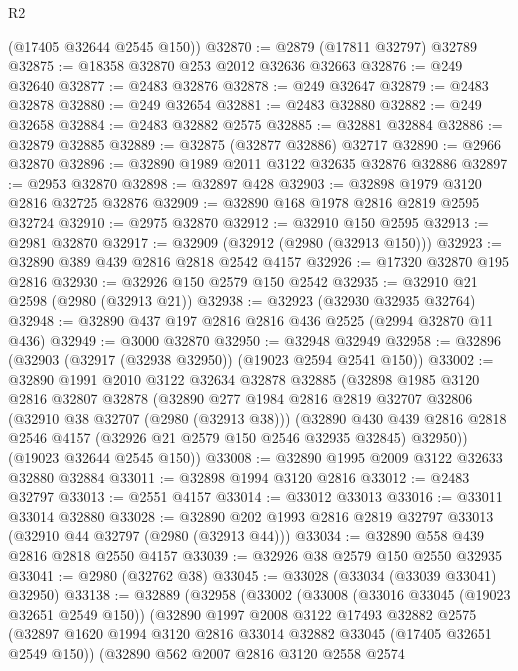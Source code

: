 \begin{lexlean}{R2}
\begin{coremodule}
      (@17405 @32644 @2545 @150))
@32870 := @2879 (@17811 @32797) @32789
@32875 := @18358 @32870 @253 @2012 @32636 @32663
@32876 := @249 @32640
@32877 := @2483 @32876
@32878 := @249 @32647
@32879 := @2483 @32878
@32880 := @249 @32654
@32881 := @2483 @32880
@32882 := @249 @32658
@32884 := @2483 @32882 @2575
@32885 := @32881 @32884
@32886 := @32879 @32885
@32889 := @32875 (@32877 @32886) @32717
@32890 := @2966 @32870
@32896 := @32890 @1989 @2011 @3122 @32635 @32876 @32886
@32897 := @2953 @32870
@32898 := @32897 @428
@32903 := @32898 @1979 @3120 @2816 @32725 @32876
@32909 := @32890 @168 @1978 @2816 @2819 @2595 @32724
@32910 := @2975 @32870
@32912 := @32910 @150 @2595
@32913 := @2981 @32870
@32917 := @32909 (@32912 (@2980 (@32913 @150)))
@32923 := @32890 @389 @439 @2816 @2818 @2542 @4157
@32926 := @17320 @32870 @195 @2816
@32930 := @32926 @150 @2579 @150 @2542
@32935 := @32910 @21 @2598 (@2980 (@32913 @21))
@32938 := @32923 (@32930 @32935 @32764)
@32948 := @32890 @437 @197 @2816 @2816 @436 @2525 (@2994 @32870 @11 @436)
@32949 := @3000 @32870
@32950 := @32948 @32949
@32958 := @32896 (@32903 (@32917 (@32938 @32950)) (@19023 @2594 @2541 @150))
@33002 := @32890
    @1991
    @2010
    @3122
    @32634
    @32878
    @32885
    (@32898
      @1985
      @3120
      @2816
      @32807
      @32878
      (@32890
        @277
        @1984
        @2816
        @2819
        @32707
        @32806
        (@32910 @38 @32707 (@2980 (@32913 @38)))
        (@32890
          @430
          @439
          @2816
          @2818
          @2546
          @4157
          (@32926 @21 @2579 @150 @2546 @32935 @32845)
          @32950))
      (@19023 @32644 @2545 @150))
@33008 := @32890 @1995 @2009 @3122 @32633 @32880 @32884
@33011 := @32898 @1994 @3120 @2816
@33012 := @2483 @32797
@33013 := @2551 @4157
@33014 := @33012 @33013
@33016 := @33011 @33014 @32880
@33028 := @32890 @202 @1993 @2816 @2819 @32797 @33013 (@32910 @44 @32797 (@2980 (@32913 @44)))
@33034 := @32890 @558 @439 @2816 @2818 @2550 @4157
@33039 := @32926 @38 @2579 @150 @2550 @32935
@33041 := @2980 (@32762 @38)
@33045 := @33028 (@33034 (@33039 @33041) @32950)
@33138 := @32889
    (@32958
      (@33002
        (@33008
          (@33016 @33045 (@19023 @32651 @2549 @150))
          (@32890
            @1997
            @2008
            @3122
            @17493
            @32882
            @2575
            (@32897 @1620 @1994 @3120 @2816 @33014 @32882 @33045 (@17405 @32651 @2549 @150))
            (@32890
              @562
              @2007
              @2816
              @3120
              @2558
              @2574

\end{coremodule}
\end{lexlean}
